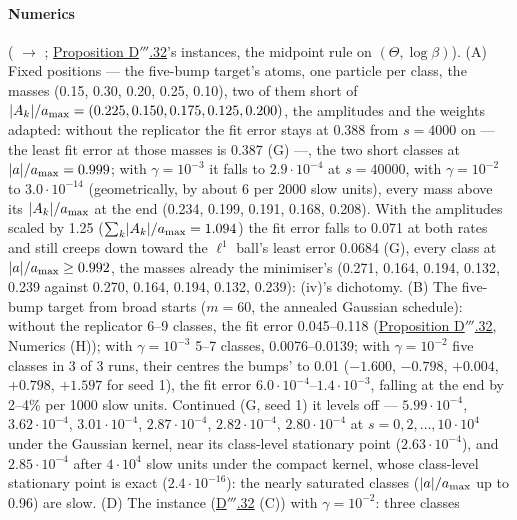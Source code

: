 \begin{sloppypar}
\paragraph{Numerics} ( $\to$ ;
\hyperref[res:thmDppp:32]{Proposition D$'''$.32}'s instances, the midpoint rule on $(\Theta,\log\beta)$). (A) Fixed
positions --- the five-bump target's atoms, one particle per class, the masses (0.15, 0.30, 0.20, 0.25, 0.10), two of
them short of $\lvert A_k\rvert/a_{\max} = (0.225, 0.150, 0.175, 0.125, 0.200)$, the amplitudes and the weights adapted:
without the replicator the fit error stays at 0.388 from $s = 4000$ on --- the least fit error at those masses is
0.387 (G) ---, the two short classes at $\lvert a\rvert/a_{\max} = 0.999$; with $\gamma = 10^{-3}$ it falls to
$2.9\cdot10^{-4}$ at $s = 40000$, with $\gamma = 10^{-2}$ to $3.0\cdot10^{-14}$ (geometrically, by about 6 per 2000
slow units), every mass above its $\lvert A_k\rvert/a_{\max}$ at the end (0.234, 0.199, 0.191, 0.168, 0.208). With the
amplitudes scaled by 1.25 ($\sum_k\lvert A_k\rvert/a_{\max} = 1.094$) the fit error falls to 0.071 at both rates and still
creeps down toward the $\ell^1$ ball's least error 0.0684 (G), every class at $\lvert a\rvert/a_{\max}\ge0.992$, the masses
already the minimiser's (0.271, 0.164, 0.194, 0.132, 0.239 against 0.270, 0.164, 0.194, 0.132, 0.239): (iv)'s
dichotomy. (B) The five-bump target from broad starts ($m = 60$, the annealed Gaussian schedule): without the
replicator 6--9 classes, the fit error 0.045--0.118 (\hyperref[res:thmDppp:32]{Proposition D$'''$.32}, Numerics
(H)); with $\gamma = 10^{-3}$ 5--7 classes, 0.0076--0.0139; with $\gamma = 10^{-2}$ five classes in 3 of 3 runs,
their centres the bumps' to 0.01 ($-1.600$, $-0.798$, $+0.004$, $+0.798$, $+1.597$ for seed 1), the fit error
$6.0\cdot10^{-4}$--$1.4\cdot10^{-3}$, falling at the end by 2--4\% per 1000 slow units. Continued (G, seed 1) it
levels off --- $5.99\cdot10^{-4}$, $3.62\cdot10^{-4}$, $3.01\cdot10^{-4}$, $2.87\cdot10^{-4}$, $2.82\cdot10^{-4}$,
$2.80\cdot10^{-4}$ at $s = 0, 2, \dots, 10\cdot10^4$ under the Gaussian kernel, near its class-level stationary point
($2.63\cdot10^{-4}$), and $2.85\cdot10^{-4}$ after $4\cdot10^4$ slow units under the compact kernel, whose
class-level stationary point is exact ($2.4\cdot10^{-16}$): the nearly saturated classes ($\lvert a\rvert/a_{\max}$ up to
0.96) are slow. (D) The instance (\hyperref[res:thmDppp:32]{D$'''$.32} (C)) with $\gamma = 10^{-2}$: three classes

\end{sloppypar}
